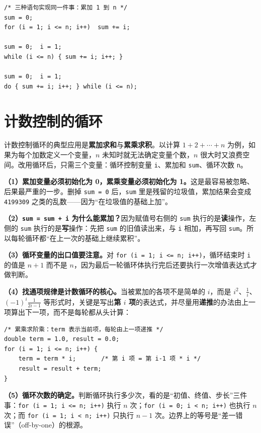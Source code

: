 \begin{lstlisting}
/* 三种语句实现同一件事：累加 1 到 n */
sum = 0;
for (i = 1; i <= n; i++)  sum += i;

sum = 0;  i = 1;
while (i <= n) { sum += i; i++; }

sum = 0;  i = 1;
do { sum += i; i++; } while (i <= n);
\end{lstlisting}

\section{计数控制的循环}

计数控制循环的典型应用是\textbf{累加求和}与\textbf{累乘求积}。以计算 $1+2+\cdots+n$ 为例，如果为每个加数定义一个变量，$n$ 未知时就无法确定变量个数，$n$ 很大时又浪费空间。改用循环后，只需三个变量：循环控制变量 \texttt{i}、累加和 \texttt{sum}、循环次数 \texttt{n}。

\textbf{（1）累加变量必须初始化为 0，累乘变量必须初始化为 1。}这是最容易被忽略、后果最严重的一步。删掉 \texttt{sum = 0} 后，\texttt{sum} 里是残留的垃圾值，累加结果会变成 \texttt{4199309} 之类的乱数——因为“在垃圾值的基础上加”。

\textbf{（2）\texttt{sum = sum + i} 为什么能累加？}因为赋值号右侧的 \texttt{sum} 执行的是\textbf{读}操作，左侧的 \texttt{sum} 执行的是\textbf{写}操作：先把 \texttt{sum} 的旧值读出来，与 \texttt{i} 相加，再写回 \texttt{sum}。所以每轮循环都“在上一次的基础上继续累积”。

\textbf{（3）循环变量的出口值要注意。}对 \texttt{for (i = 1; i <= n; i++)}，循环结束时 \texttt{i} 的值是 $n+1$ 而不是 $n$，因为最后一轮循环体执行完后还要执行一次增值表达式才做判断。

\textbf{（4）找通项规律是计数循环的核心。}当被累加的各项不是简单的 $i$，而是 $i^{2}$、$\frac{1}{i}$、$(-1)^{i}\frac{1}{2i-1}$ 等形式时，关键是写出\textbf{第 $i$ 项}的表达式，并尽量用\textbf{递推}的办法由上一项算出下一项，而不是每轮都从头计算：

\begin{lstlisting}
/* 累乘求阶乘：term 表示当前项，每轮由上一项递推 */
double term = 1.0, result = 0.0;
for (i = 1; i <= n; i++) {
    term = term * i;       /* 第 i 项 = 第 i-1 项 * i */
    result = result + term;
}
\end{lstlisting}

\textbf{（5）循环次数的确定。}判断循环执行多少次，看的是“初值、终值、步长”三件事：\texttt{for (i = 1; i <= n; i++)} 执行 $n$ 次；\texttt{for (i = 0; i < n; i++)} 也执行 $n$ 次；而 \texttt{for (i = 1; i < n; i++)} 只执行 $n-1$ 次。边界上的等号是“差一错误”（off-by-one）的根源。

